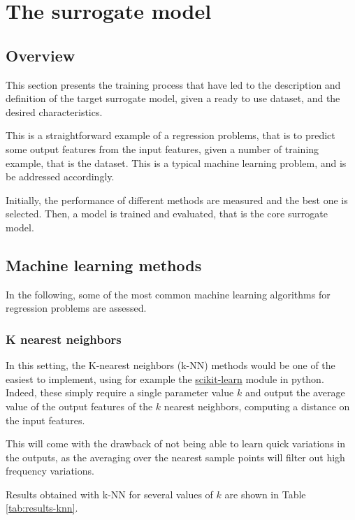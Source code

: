 \section{The surrogate model}

\subsection{Overview}

This section presents the training process that have led to the description and definition of the target surrogate model, given a ready to use dataset, and the desired characteristics.

This is a straightforward example of a regression problems, that is to predict some output features from the input features, given a number of training example, that is the dataset. This is a typical machine learning problem, and is be addressed accordingly.

Initially, the performance of different methods are measured and the best one is selected. Then, a model is trained and evaluated, that is the core surrogate model.

\subsection{Machine learning methods}

In the following, some of the most common machine learning algorithms for regression problems \cite{machine-learning-class} are assessed.

\subsubsection{K nearest neighbors}

In this setting, the K-nearest neighbors (k-NN) methods would be one of the easiest to implement, using for example the \href{https://scikit-learn.org/stable/modules/neighbors.html\#nearest-neighbors-regression}{scikit-learn} \cite{scikit-learn} module in python. Indeed, these simply require a single parameter value $k$ and output the average value of the output features of the $k$ nearest neighbors, computing a distance on the input features.

This will come with the drawback of not being able to learn quick variations in the outputs, as the averaging over the nearest sample points will filter out high frequency variations.

Results obtained with k-NN for several values of $k$ are shown in Table \ref{tab:results-knn}.

